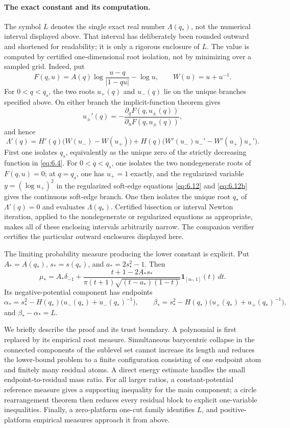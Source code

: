\documentclass[11pt]{article}
\numberwithin{equation}{section}
\theoremstyle{plain}
\theoremstyle{definition}
\theoremstyle{remark}
\newcommand{\1}{\mathbf 1}
\newcommand{\dd}{\,d}
\begin{document}
\paragraph{The exact constant and its computation.}
The symbol $L$ denotes the single exact real number $\Lambda(q_*)$, not
the numerical interval displayed above.  That interval has deliberately
been rounded outward and shortened for readability; it is only a rigorous
enclosure of $L$.  The value is computed by certified one-dimensional root
isolation, not by minimizing over a sampled grid.  Indeed, put
\[
 F(q,u)=A(q)\log\frac{u-q}{|1-qu|}-\log u,
 \qquad W(u)=u+u^{-1}.
\]
For $0<q<q_s$, the two roots $u_+(q)$ and $u_-(q)$ lie on the unique
branches specified above.  On either branch the implicit-function theorem
gives
\[
 u_\pm'(q)=-\frac{\partial_qF(q,u_\pm(q))}
                  {\partial_uF(q,u_\pm(q))},
\]
and hence
\[
 \Lambda'(q)
 =H'(q)\bigl(W(u_-)-W(u_+)\bigr)
 +H(q)\bigl(W'(u_-)u_-'-W'(u_+)u_+'\bigr).
\]
First one isolates $q_s$, equivalently as the unique zero of the strictly
decreasing function in \eqref{eq:6.4}.  For $0<q<q_s$, one isolates the two
nondegenerate roots of $F(q,u)=0$; at $q=q_s$, one has $u_+=1$ exactly,
and the regularized variable $y=(\log u_+)^2$ in the regularized soft-edge
equations \eqref{eq:6.12} and \eqref{eq:6.12b} gives
the continuous soft-edge branch.  One then isolates the unique root
$q_*$ of $\Lambda'(q)=0$ and evaluates $\Lambda(q_*)$.  Certified
bisection or interval Newton iteration, applied to the nondegenerate or
regularized equations as appropriate, makes all of these enclosing
intervals arbitrarily narrow.  The companion verifier certifies the
particular outward enclosures displayed here.

The limiting probability measure producing the lower constant is explicit.
Put $A_*=A(q_*)$, $s_*=s(q_*)$, and $a_*=2s_*^2-1$.  Then
\[
 \mu_*=A_*\delta_{-1}+
 \frac{t+1-2A_*s_*}
 {\pi(t+1)\sqrt{(t-a_*)(1-t)}}\1_{[a_*,1]}(t)\dd t.
\]
Its negative-potential component has endpoints
\begin{equation}
 \alpha_*=s_*^2-H(q_*)\bigl(u_-(q_*)+u_-(q_*)^{-1}\bigr),\qquad
 \beta_*=s_*^2-H(q_*)\bigl(u_+(q_*)+u_+(q_*)^{-1}\bigr),
\label{eq:1.7}
\end{equation}
and $\beta_*-\alpha_*=L$.

We briefly describe the proof and its trust boundary.  A polynomial is first
replaced by its empirical root measure.  Simultaneous barycentric collapse in
the connected components of the sublevel set cannot increase its length and
reduces the lower-bound problem to a finite configuration consisting of one
endpoint atom and finitely many residual atoms.  A direct energy estimate
handles the small endpoint-to-residual mass ratio.  For all larger ratios, a
constant-potential reference measure gives a supporting inequality for the
main component; a circle rearrangement theorem then reduces every residual
block to explicit one-variable inequalities.  Finally, a zero-platform
one-cut family identifies $L$, and positive-platform empirical measures
approach it from above.
\end{document}
